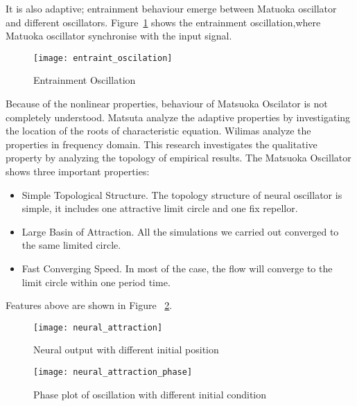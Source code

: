 It is also adaptive; entrainment behaviour emerge between Matuoka oscillator and different oscillators. 
Figure~\ref{fig:entraint-oscilation} shows the entrainment oscillation,where  Matuoka oscillator synchronise with the input signal.
\begin{figure}[h]
\begin{center}
\texttt{[image: entraint\_oscilation]}
\caption{Entrainment Oscillation}
\label{fig:entraint-oscilation}
\end{center}
\end{figure}

Because of the nonlinear properties, behaviour of Matsuoka Oscilator is not completely understood. 
Matsuta\citep{Matsuoka1987} analyze the adaptive properties by investigating the location of the roots of characteristic equation. 
Wilimas\citep{Williamson1998} analyze the properties in frequency domain.
This research investigates the qualitative property by analyzing the topology of  empirical results.
The Matsuoka Oscillator shows three important properties:
\begin{itemize}
\item{Simple Topological Structure.}
The topology structure of neural oscillator is simple, 
it includes one  attractive limit circle and one fix repellor.
\item{Large Basin of Attraction.}
All the simulations we carried out converged to the same limited circle.
\item{Fast Converging Speed.}
In most of the case, the flow will converge to the limit circle within one period time.
\end{itemize}






Features above are shown in Figure ~\ref{fig:time_timeAttraction}.
\begin{figure}
\begin{center}
\texttt{[image: neural\_attraction]}
\end{center}
\caption{Neural output with different initial position}
\label{fig:time_timeAttraction}
\end{figure}

\begin{figure}
\begin{center}
\texttt{[image: neural\_attraction\_phase]}
\end{center}
\caption{Phase plot of oscillation with different initial condition}
\label{fig:phase_attraction}
\end{figure}
 

